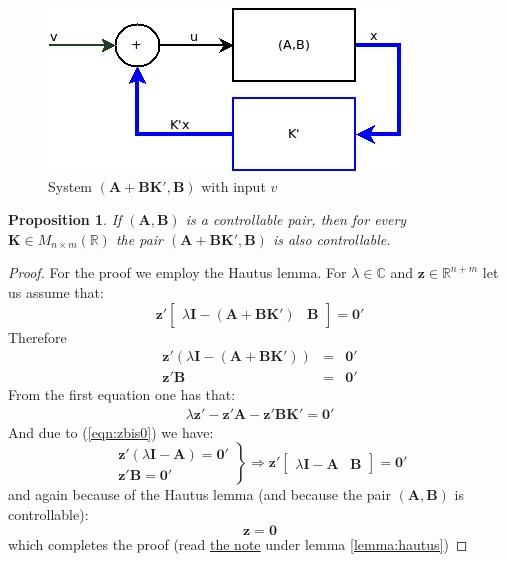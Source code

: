 \documentclass[a4paper,10pt,oneside]{book}
\newtheorem{proposition}[theorem]{Proposition}
\begin{document}
\begin{figure}[H]
 \centering
 \includegraphics[scale=0.4]{./ControllabilityAfterFeedback.jpg}
 \caption{System $(\mathbf{A}+\mathbf{BK}',\mathbf{B})$ with input $v$} 
  \label{fig:controllabilityAfterFeedback}
\end{figure}
\begin{proposition}
 If $(\mathbf{A},\mathbf{B})$ is a controllable pair, then for every $\mathbf{K}\in M_{n\times m}(\mathbb{R})$ the pair $(\mathbf{A}+\mathbf{BK}',\mathbf{B})$ is also controllable.
\end{proposition}
\begin{proof}
 For the proof we employ the Hautus lemma. For $\lambda\in\mathbb{C}$ and $\mathbf{z}\in\mathbb{R}^{n+m}$ let us assume that:
\begin{equation}
 \mathbf{z}' \left[ {\begin{array}{cc} \lambda\mathbf{I}-(\mathbf{A}+\mathbf{BK}') & \mathbf{B} \end{array} } \right]=\mathbf{0}'
\end{equation}
Therefore
\begin{eqnarray}
 \mathbf{z}' \left( \lambda\mathbf{I}-(\mathbf{A}+\mathbf{BK}') \right) &=& \mathbf{0}'\\
 \mathbf{z}' \mathbf{B}  &=& \mathbf{0}'\label{eqn:zbis0}
\end{eqnarray}
From the first equation one has that:
\begin{eqnarray}
 \lambda\mathbf{z}'  -\mathbf{z}'\mathbf{A}-\mathbf{z}'\mathbf{BK}' = \mathbf{0}'
\end{eqnarray}
And due to (\ref{eqn:zbis0}) we have:
\begin{equation}
\left. {\begin{array}{c}
 \mathbf{z}'(\lambda\mathbf{I}  -\mathbf{A}) = \mathbf{0}'\\
 \mathbf{z}'\mathbf{B}=\mathbf{0}'
 \end{array} } \right\}
  \Rightarrow \mathbf{z}'  \left[ {\begin{array}{cc} \lambda\mathbf{I}-\mathbf{A} & \mathbf{B} \end{array} } \right]=\mathbf{0}'
\end{equation}
and again because of the Hautus lemma (and because the pair $(\mathbf{A},\mathbf{B})$ is controllable):
\begin{equation}
 \mathbf{z}=\mathbf{0}
\end{equation}
which completes the proof (read \hyperlink{note:hautusLemma}{the note} under lemma \ref{lemma:hautus})
\end{proof}
\end{document}
